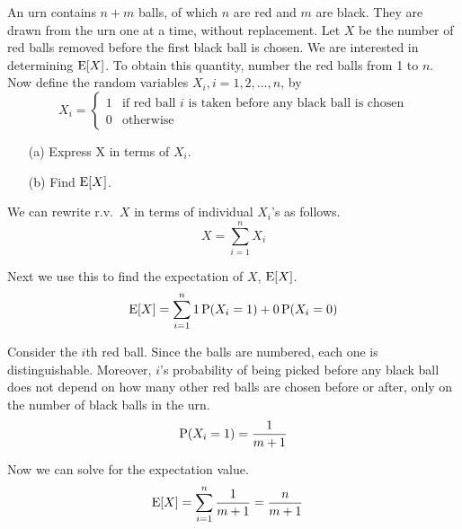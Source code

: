 \documentclass{article}
\begin{document}
    \makemytitle

    \nextproblem
    \nextproblem

    \begin{problem}
        An urn contains $n + m$ balls, of which $n$ are red and $m$ are black. They are drawn from the urn one at a time, without replacement. Let $X$ be the number of red balls removed before the first black ball is chosen. We are interested in determining $\expect[X]$. To obtain this quantity, number the red balls from 1 to $n$. Now define the random variables $X_i, i = 1, 2, \ldots, n$, by 
        \begin{equation*}
            X_i = 
                \begin{cases}
                    1 & \text{if red ball $i$ is taken before any black ball is chosen} \\
                    0 & \text{otherwise}    
                \end{cases}
        \end{equation*}
        \begin{enumerate}
            \item[(a)] Express X in terms of $X_i$. 
            \item[(b)]  Find $\expect[X]$.
        \end{enumerate}
    \end{problem}


    \begin{solution}
        We can rewrite r.v.~$X$ in terms of individual $X_i$'s as follows.
        \begin{equation}
            X = \sum_{i=1}^n X_i
        \end{equation}

        Next we use this to find the expectation of $X$, $\expect[X]$.
        \begin{equation*}
            \E[X] = \sum_{i=1}^n 1\P(X_i = 1) +  0\P(X_i = 0)
        \end{equation*}

        Consider the $i$th red ball. Since the balls are numbered, each one is distinguishable. Moreover, $i$'s probability of being picked before any black ball does not depend on how many other red balls are chosen before or after, only on the number of black balls in the urn.
        \begin{equation*}
            \P(X_i = 1) = \frac{1} {m + 1}
        \end{equation*}

        Now we can solve for the expectation value.
        \begin{align}
            \begin{aligned}
            \E[X] &= \sum_{i = 1}^{n} \frac{1} {m + 1} = \frac{n}{m + 1} 
            \end{aligned}
        \end{align}
    \end{solution}
\end{document}
